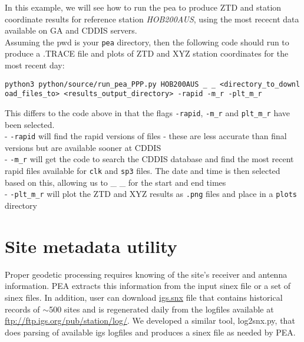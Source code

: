 In this example, we will see how to run the pea to produce ZTD and
station coordinate results for reference station \emph{HOB200AUS}, using
the most rececnt data available on GA and CDDIS servers.\\
Assuming the pwd is your \texttt{pea} directory, then the following code
should run to produce a .TRACE file and plots of ZTD and XYZ station
coordinates for the most recent day:

\texttt{python3\ python/source/run\_pea\_PPP.py\ HOB200AUS\ \_\ \_\ \textless{}directory\_to\_download\_files\_to\textgreater{}\ \textless{}results\_output\_directory\textgreater{}\ -rapid\ -m\_r\ -plt\_m\_r}

This differs to the code above in that the flags \texttt{-rapid},
\texttt{-m\_r} and \texttt{plt\_m\_r} have been selected.\\
- \texttt{-rapid} will find the rapid versions of files - these are less
accurate than final versions but are available sooner at CDDIS\\
- \texttt{-m\_r} will get the code to search the CDDIS database and find
the most recent rapid files available for \texttt{clk} and \texttt{sp3}
files. The date and time is then selected based on this, allowing us to
\_ \_ for the start and end times\\
- \texttt{-plt\_m\_r} will plot the ZTD and XYZ results as \texttt{.png}
files and place in a \texttt{plots} directory


\section{Site metadata utility}\label{log2snx}

Proper geodetic processing requires knowing of the site's receiver and antenna information. PEA extracts this information from the input sinex file or a set of sinex files. In addition, user can download \href{ftp://igs.ensg.ign.fr/pub/igs/igscb/station/general/igs.snx}{igs.snx} file that contains historical records of $\sim$500 sites and is regenerated daily from the logfiles available at \url{ftp://ftp.igs.org/pub/station/log/}. We developed a similar tool, log2snx.py, that does parsing of available igs logfiles and produces a sinex file as needed by PEA.

